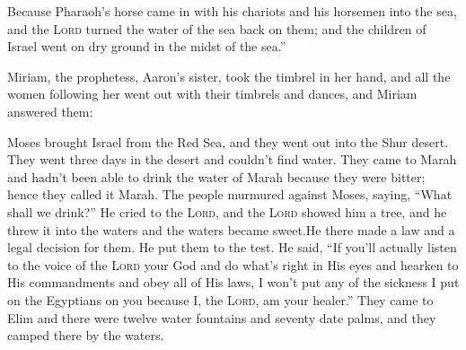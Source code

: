 \begin{inparaenum}
    
     Because Pharaoh's horse came in with his chariots and his horsemen into the sea, and the \textsc{Lord} turned the water of the sea back on them; and the children of Israel went on dry ground in the midst of the sea.''%
    
     Miriam, the prophetess, Aaron's sister, took the timbrel in her hand, and all the women following her went out with their timbrels and dances,%
     and Miriam answered them:\smallskip%
    
    
     Moses brought Israel from the Red Sea, and they went out into the Shur desert. They went three days in the desert and couldn't find water.%
     They came to Marah and hadn't been able to drink the water of Marah because they were bitter; hence they called it Marah.%
     The people murmured against Moses, saying, ``What shall we drink?''%
     He cried to the \textsc{Lord}, and the \textsc{Lord} showed him a tree, and he threw it into the waters and the waters became sweet.\hspace*{4em}He there made a law and a legal decision for them. He put them to the test.%
     He said, ``If you'll actually listen to the voice of the \textsc{Lord} your God and do what's right in His eyes and hearken to His commandments and obey all of His laws, I won't put any of the sickness I put on the Egyptians on you because I, the \textsc{Lord}, am your healer.''%
     They came to Elim and there were twelve water fountains and seventy date palms, and they camped there by the waters.%
\end{inparaenum}
